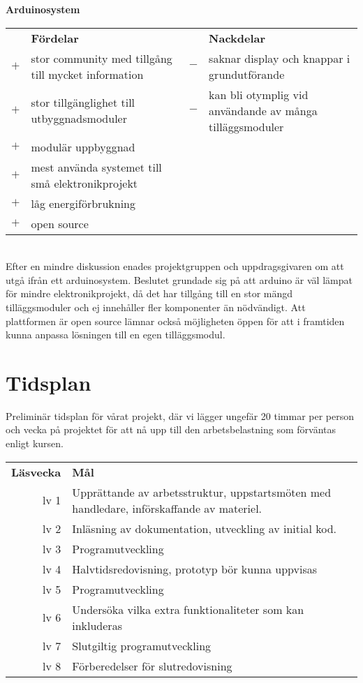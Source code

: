 \documentclass{article}
\begin{document}
		\noindent\textsf{\textbf{Arduinosystem}}\\
		\begin{tabularx}{\textwidth}{@{}cXcX}
			& \textbf{Fördelar} 	& & \textbf{Nackdelar} \\
			$+$ & stor community med tillgång till mycket information & $-$ & saknar display och knappar i grundutförande \\
			$+$ & stor tillgänglighet till utbyggnadsmoduler & $-$ & kan bli otymplig vid användande av många tilläggsmoduler \\
			$+$ & modulär uppbyggnad \\
			$+$ & mest använda systemet till små elektronikprojekt \\
			$+$ & låg energiförbrukning \\
			$+$ & open source \\
		\end{tabularx} \\

		\vspace{2mm}\noindent Efter en mindre diskussion enades projektgruppen och uppdragsgivaren om att utgå ifrån ett arduinosystem. Beslutet grundade sig på att arduino är väl lämpat för mindre elektronikprojekt, då det har tillgång till en stor mängd tilläggsmoduler och ej innehåller fler komponenter än nödvändigt. Att plattformen är open source lämnar också möjligheten öppen för att i framtiden kunna anpassa lösningen till en egen tilläggsmodul.
	\section*{Tidsplan} %
	\label{sec:section_name}
	Preliminär tidsplan för vårat projekt, där vi lägger ungefär 20 timmar per person och vecka på projektet för att nå upp till den arbetsbelastning som förväntas enligt kursen. \\

	\noindent\begin{tabularx}{\textwidth}{@{}rX}
		\textbf{Läsvecka} & \textbf{Mål}\\
		lv 1 &	Upprättande av arbetsstruktur, uppstartsmöten med handledare, införskaffande av materiel. \\
		lv 2 & Inläsning av dokumentation, utveckling av initial kod. \\
		lv 3 & Programutveckling\\
		lv 4 & Halvtidsredovisning, prototyp bör kunna uppvisas\\
		lv 5 & Programutveckling\\
		lv 6 & Undersöka vilka extra funktionaliteter som kan inkluderas\\
		lv 7 & Slutgiltig programutveckling\\
		lv 8 & Förberedelser för slutredovisning \\
	\end{tabularx}
\end{document}
